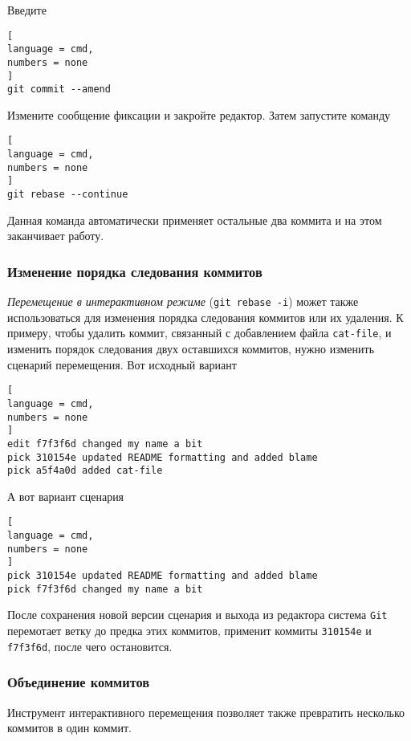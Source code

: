 \documentclass[%
	11pt,
	a4paper,
	utf8,
		]{article}
\begin{document}
Введите 
\begin{lstlisting}[
language = cmd,
numbers = none
]
git commit --amend
\end{lstlisting}

Измените сообщение фиксации и закройте редактор. Затем запустите команду

\begin{lstlisting}[
language = cmd,
numbers = none
]
git rebase --continue
\end{lstlisting}

Данная команда автоматически применяет остальные два коммита и на этом заканчивает работу.

\subsubsection{Изменение порядка следования коммитов}

\emph{Перемещение в интерактивном режиме} (\lstinline{git rebase -i}) может также использоваться для изменения порядка следования коммитов или их удаления. К примеру, чтобы удалить коммит, связанный с добавлением файла \texttt{cat-file}, и изменить порядок следования двух оставшихся коммитов, нужно изменить сценарий перемещения. Вот исходный вариант

\begin{lstlisting}[
language = cmd,
numbers = none
]
edit f7f3f6d changed my name a bit
pick 310154e updated README formatting and added blame
pick a5f4a0d added cat-file 
\end{lstlisting}

А вот вариант сценария

\begin{lstlisting}[
language = cmd,
numbers = none
]
pick 310154e updated README formatting and added blame
pick f7f3f6d changed my name a bit
\end{lstlisting}

После сохранения новой версии сценария и выхода из редактора система \texttt{Git} перемотает ветку до предка этих коммитов, применит коммиты \texttt{310154e} и \texttt{f7f3f6d}, после чего остановится.

\subsubsection{Объединение коммитов}

Инструмент интерактивного перемещения позволяет также превратить несколько коммитов в один коммит.
\end{document}
